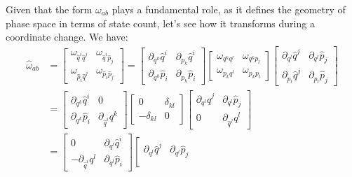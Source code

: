Given that the form $\omega_{ab}$ plays a fundamental role, as it defines the geometry of phase space in terms of state count, let's see how it transforms during a coordinate change. We have:
\begin{equation}
	\begin{aligned}
		\hat{\omega}_{ab} &=\left[\begin{array}{cc}
			\omega_{\hat{q}^i \hat{q}^j} & \omega_{\hat{q}^i \hat{p}_j} \\
			\omega_{\hat{p}_i \hat{q}^j} & \omega_{\hat{p}_i \hat{p}_j} 
		\end{array} \right] = \left[\begin{array}{cc}
			\partial_{q^k} \hat{q}^i & \partial_{p_k} \hat{q}^i \\
			\partial_{q^k} \hat{p}_i & \partial_{p_k} \hat{p}_i 
		\end{array} \right]
		\left[\begin{array}{cc}
			\omega_{q^k q^l} & \omega_{q^k p_l} \\
			\omega_{p_k q^l} & \omega_{p_k p_l} 
		\end{array} \right]
		\left[\begin{array}{cc}
			\partial_{q^l} \hat{q}^j & \partial_{q^l} \hat{p}_j \\
			\partial_{p_l} \hat{q}^j & \partial_{p_l} \hat{p}_j 
		\end{array} \right]\\
		&= \left[\begin{array}{cc}
			\partial_{q^k} \hat{q}^i & 0 \\
			\partial_{q^k} \hat{p}_i & \partial_{\hat{q}^i} q^k 
		\end{array} \right]
		\left[\begin{array}{cc}
			0 & \delta_{kl} \\
			- \delta_{kl} & 0 
		\end{array} \right]
		\left[\begin{array}{cc}
			\partial_{q^l} \hat{q}^j & \partial_{q^l} \hat{p}_j \\
			0 & \partial_{\hat{q}^j} q^l 
		\end{array} \right] \\
		&= \left[\begin{array}{cc}
			0 & \partial_{q^l} \hat{q}^i \\
			- \partial_{\hat{q}^i} q^l  & \partial_{q^l} \hat{p}_i 
		\end{array} \right]
		\left[\begin{array}{cc}
			\partial_{q^l} \hat{q}^j & \partial_{q^l} \hat{p}_j \\

\end{array}
\end{aligned}
\end{equation}
